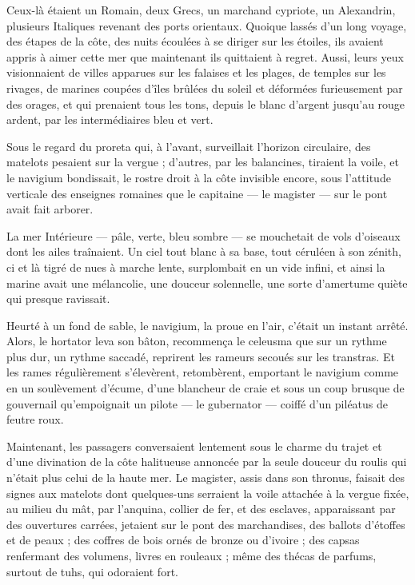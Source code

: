 \documentclass[a4paper, 11pt, oneside, polutonikogreek, french]{article}
\begin{document}
Ceux-là étaient un Romain, deux Grecs, un marchand cypriote, un Alexandrin, plusieurs Italiques revenant des ports orientaux. Quoique lassés d'un long voyage, des étapes de la côte, des nuits écoulées à se diriger sur les étoiles, ils avaient appris à aimer cette mer que maintenant ils quittaient à regret. Aussi, leurs yeux visionnaient de villes apparues sur les falaises et les plages, de temples sur les rivages, de marines coupées d'îles brûlées du soleil et déformées furieusement par des orages, et qui prenaient tous les tons, depuis le blanc d'argent jusqu'au rouge ardent, par les intermédiaires bleu et vert.

Sous le regard du proreta qui, à l'avant, surveillait l'horizon circulaire, des matelots pesaient sur la vergue ; d'autres, par les balancines, tiraient la voile, et le navigium bondissait, le rostre droit à la côte invisible encore, sous l'attitude verticale des enseignes romaines que le capitaine --- le magister --- sur le pont avait fait arborer.

La mer Intérieure --- pâle, verte, bleu sombre --- se mouchetait de vols d'oiseaux dont les ailes traînaient. Un ciel tout blanc à sa base, tout céruléen à son zénith, ci et là tigré de nues à marche lente, surplombait en un vide infini, et ainsi la marine avait une mélancolie, une douceur solennelle, une sorte d'amertume quiète qui presque ravissait.

Heurté à un fond de sable, le navigium, la proue en l'air, c’était un instant arrêté. Alors, le hortator leva son bâton, recommença le celeusma que sur un rythme plus dur, un rythme saccadé, reprirent les rameurs secoués sur les transtras. Et les rames régulièrement s'élevèrent, retombèrent, emportant le navigium comme en un soulèvement d'écume, d'une blancheur de craie et sous un coup brusque de gouvernail qu'empoignait un pilote --- le gubernator --- coiffé d'un piléatus de feutre roux.

Maintenant, les passagers conversaient lentement sous le charme du trajet et d'une divination de la côte halitueuse annoncée par la seule douceur du roulis qui n'était plus celui de la haute mer. Le magister, assis dans son thronus, faisait des signes aux matelots dont quelques-uns serraient la voile attachée à la vergue fixée, au milieu du mât, par l'anquina, collier de fer, et des esclaves, apparaissant par des ouvertures carrées, jetaient sur le pont des marchandises, des ballots d'étoffes et de peaux ; des coffres de bois ornés de bronze ou d'ivoire ; des capsas renfermant des volumens, livres en rouleaux ; même des thécas de parfums, surtout de tuhs, qui odoraient fort.
\end{document}
